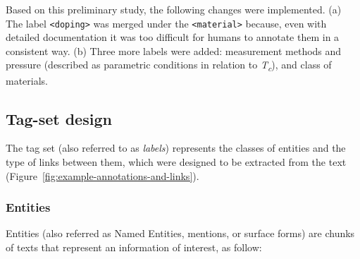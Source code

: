\documentclass[]{interact}
\theoremstyle{plain}%
\theoremstyle{definition}
\theoremstyle{remark}
\begin{document}
Based on this preliminary study, the following changes were implemented. 
(a) The label \texttt{<doping>} was merged under the \texttt{<material>} because, even with detailed documentation it was too difficult for humans to annotate them in a consistent way.
(b) Three more labels were added: measurement methods and pressure (described as parametric conditions in relation to \textit{T\textsubscript{c}}), and class of materials. 

\subsection{Tag-set design}
The tag set (also referred to as \textit{labels}) represents the classes of entities and the type of links between them, which were designed to be extracted from the text (Figure~\ref{fig:example-annotations-and-links}).

\subsubsection{Entities}
Entities (also referred as Named Entities, mentions, or surface forms) are chunks of texts that represent an information of interest, as follow: 
\end{document}
